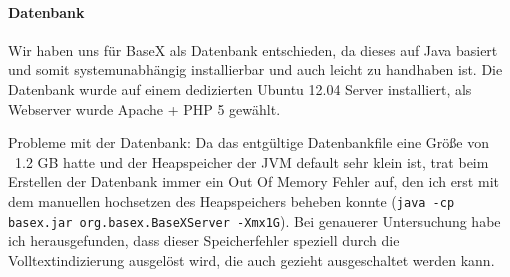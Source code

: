 \paragraph{Datenbank}
Wir haben uns für BaseX als Datenbank entschieden, da dieses auf Java basiert und somit systemunabhängig installierbar und auch leicht zu handhaben ist. Die Datenbank wurde auf einem dedizierten Ubuntu 12.04 Server installiert, als Webserver wurde Apache + PHP 5 gewählt.

Probleme mit der Datenbank: Da das entgültige Datenbankfile eine Größe von ~1.2 GB hatte und der Heapspeicher der JVM default sehr klein ist, trat beim Erstellen der Datenbank immer ein Out Of Memory Fehler auf, den ich erst mit dem manuellen hochsetzen des Heapspeichers beheben konnte ({\tt java -cp basex.jar org.basex.BaseXServer -Xmx1G}). Bei genauerer Untersuchung habe ich herausgefunden, dass dieser Speicherfehler speziell durch die Volltextindizierung ausgelöst wird, die auch gezieht ausgeschaltet werden kann. 
